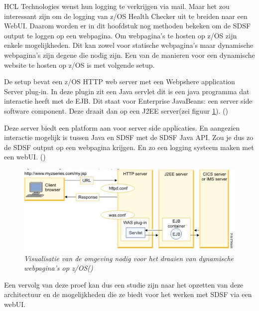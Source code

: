 HCL Technologies wenst hun logging te verkrijgen via mail. Maar het zou interessant zijn om de logging van z/OS Health Checker uit te breiden naar een WebUI. Daarom worden er in dit hoofdstuk nog methoden bekeken om de SDSF output te loggen op een webpagina. Om webpagina's te hosten op z/OS zijn enkele mogelijkheden. Dit kan zowel voor statische webpagina's maar dynamische webpagina's zijn degene die nodig zijn. Een van de manieren voor een dynamische website te hosten op z/OS is met volgende setup.

De setup bevat een z/OS HTTP web server met een Webpshere application Server plug-in. In deze plugin zit een Java servlet dit is een java programma dat interactie heeft met de EJB. Dit staat voor Enterprise JavaBeans: een server side software component. Deze draait dan op een J2EE server(zei figuur \ref{fig:webpshereapplicationserver}). (\cite{IBM2010})

Deze server biedt een platform aan voor server side applicaties. En aangezien interactie mogelijk is tussen Java en SDSF met de SDSF Java API. Zou je dus zo de SDSF output op een webpagina krijgen. En zo een logging systeem maken met een webUI. (\cite{Vilaghy2002})

\begin{figure}[h]
	\centering
	\includegraphics{img/WebpshereApplicationServer}
	\caption[Websphere Application Server]{{\small \textit{Visualisatie van de omgeving nodig voor het draaien van dynamische webpagina's op z/OS(\cite{IBM2010})}}}
	\label{fig:webpshereapplicationserver}
\end{figure}


Een vervolg van deze proef kan dus een studie zijn naar het opzetten van deze architectuur en de mogelijkheden die ze biedt voor het werken met SDSF via een webUI.





